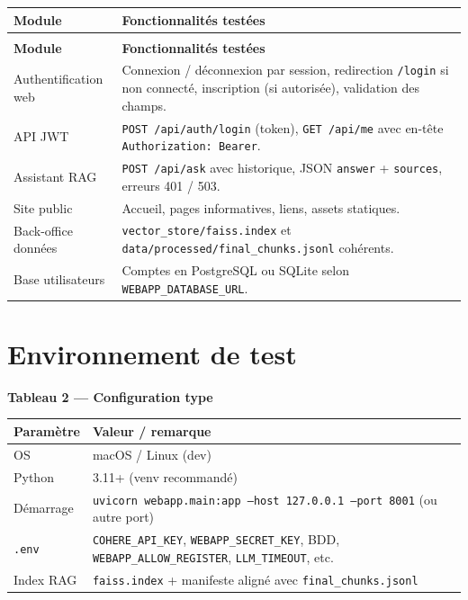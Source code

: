\documentclass[11pt,a4paper]{article}
\begin{document}
\small
\begin{longtable}{@{}>{\raggedright\arraybackslash}p{3.2cm}p{10.2cm}@{}}
\toprule
\textbf{Module} & \textbf{Fonctionnalités testées} \\
\midrule
\endfirsthead
\multicolumn{2}{c}{\tablename\ \thetable\ — \textit{suite}} \\
\toprule
\textbf{Module} & \textbf{Fonctionnalités testées} \\
\midrule
\endhead
\bottomrule
\endlastfoot
Authentification web & Connexion / déconnexion par session, redirection \texttt{/login} si non connecté, inscription (si autorisée), validation des champs. \\
API JWT & \texttt{POST /api/auth/login} (token), \texttt{GET /api/me} avec en-tête \texttt{Authorization: Bearer}. \\
Assistant RAG & \texttt{POST /api/ask} avec historique, JSON \texttt{answer} + \texttt{sources}, erreurs 401 / 503. \\
Site public & Accueil, pages informatives, liens, assets statiques. \\
Back-office données & \texttt{vector\_store/faiss.index} et \texttt{data/processed/final\_chunks.jsonl} cohérents. \\
Base utilisateurs & Comptes en PostgreSQL ou SQLite selon \texttt{WEBAPP\_DATABASE\_URL}. \\
\end{longtable}
\normalsize

\section{Environnement de test}
\textbf{Tableau 2 — Configuration type}

\small
\begin{longtable}{@{}p{3.4cm}p{10.2cm}@{}}
\toprule
\textbf{Paramètre} & \textbf{Valeur / remarque} \\
\midrule
OS & macOS / Linux (dev) \\
Python & 3.11+ (venv recommandé) \\
Démarrage & \texttt{uvicorn webapp.main:app --host 127.0.0.1 --port 8001} (ou autre port) \\
\texttt{.env} & \texttt{COHERE\_API\_KEY}, \texttt{WEBAPP\_SECRET\_KEY}, BDD, \texttt{WEBAPP\_ALLOW\_REGISTER}, \texttt{LLM\_TIMEOUT}, etc. \\
Index RAG & \texttt{faiss.index} + manifeste aligné avec \texttt{final\_chunks.jsonl} \\
\bottomrule
\end{longtable}
\normalsize
\end{document}
